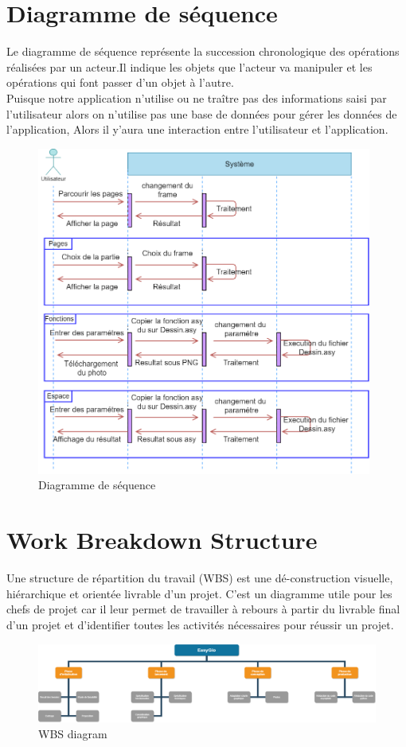 \documentclass[a4paper]{report}
\begin{document}
\section{Diagramme de séquence}
Le diagramme de séquence représente la succession chronologique des opérations réalisées par un acteur.Il indique les objets que l'acteur va manipuler et les opérations qui font passer d'un objet à l'autre.\\
Puisque notre application n'utilise ou  ne traître pas des informations saisi par l'utilisateur alors on n'utilise pas une base de données pour gérer les données de l'application, Alors il y'aura une interaction entre l'utilisateur et l'application.
\begin{figure}[!h]
    \centering
    \includegraphics[width=11cm]{images/DS.png}
    \caption{Diagramme de séquence}
    \label{fig:Diagramme de séquence}
\end{figure}
\newpage
\section{Work Breakdown Structure}
Une structure de répartition du travail (WBS) est une dé-construction visuelle, hiérarchique et orientée livrable d'un projet. C'est un diagramme utile pour les chefs de projet car il leur permet de travailler à rebours à partir du livrable final d'un projet et d'identifier toutes les activités nécessaires pour réussir un projet.
\begin{figure}[!h]
    \centering
    \includegraphics[width=15cm]{images/WBS.png}
    \caption{WBS diagram}
    \label{WBS diagram}
\end{figure}
\newpage
\end{document}
